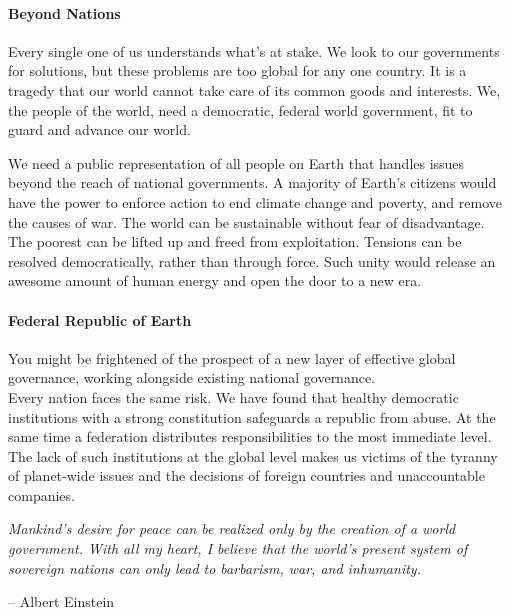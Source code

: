 \documentclass[11pt,a4paper]{article}
\begin{document}
\begin{multicols}{2}

\paragraph{Beyond Nations} 

Every single one of us understands what's at stake.
We look to our governments for solutions, but these problems are too global for any one country.
It is a tragedy that our world cannot take care of its common goods and interests.
We, the people of the world, need a democratic, federal world government, fit to guard and advance our world.

\noindent We need a public representation of all people on Earth that handles issues beyond the reach of national governments.
A majority of Earth's citizens would have the power to enforce action to end climate change and poverty, and remove the causes of war.
The world can be sustainable without fear of disadvantage.
The poorest can be lifted up and freed from exploitation.
Tensions can be resolved democratically, rather than through force.
Such unity would release an awesome amount of human energy and open the door to a new era.

\paragraph{Federal Republic of Earth}

You might be frightened of the prospect of a new layer of effective global governance, working alongside existing national governance.\\
\noindent Every nation faces the same risk.
We have found that healthy democratic institutions with a strong constitution safeguards a republic from abuse.
At the same time a federation distributes responsibilities to the most immediate level.
The lack of such institutions at the global level makes us victims of the tyranny of planet-wide issues and the decisions of foreign countries and unaccountable companies.

\begin{shaded*}
\noindent \textit{Mankind's desire for peace can be realized only by the creation of a world government. With all my heart, I believe that the world's present system of sovereign nations can only lead to barbarism, war, and inhumanity.}
\begin{flushright}
-- Albert Einstein
\end{flushright}
\vspace{-12pt}
\end{shaded*}


\end{multicols}
\end{document}
